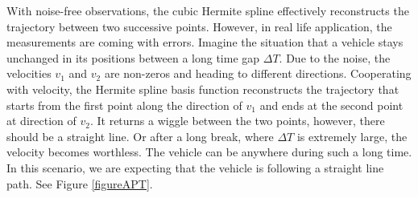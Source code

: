 With noise-free observations, the cubic Hermite spline effectively reconstructs the trajectory between two successive points. However, in real life application, the measurements are coming with errors. Imagine the situation that a vehicle stays unchanged in its positions between a long time gap $\Delta T$. Due to the noise, the velocities $v_1$ and $v_2$ are non-zeros and heading to different directions. Cooperating with velocity, the Hermite spline basis function reconstructs the trajectory that starts from the first point along the direction of $v_1$ and ends at the second point at direction of $v_2$. It returns a wiggle between the two points, however, there should be a straight line. Or after a long break, where $\Delta T$ is extremely large, the velocity becomes worthless. The vehicle can be anywhere during such a long time. In this scenario, we are expecting that the vehicle is following a straight line path. See Figure \ref{figureAPT}. 

